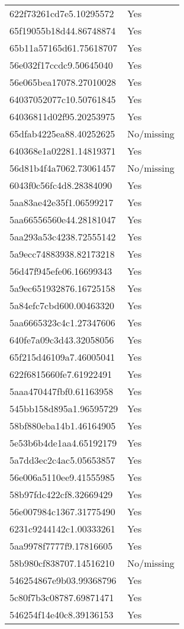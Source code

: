 \begin{tabular}{ll}
622f73261cd7e5.10295572 & Yes \\
65f19055b18d44.86748874 & Yes \\
65b11a57165d61.75618707 & Yes \\
56e032f17ccdc9.50645040 & Yes \\
56e065bea17078.27010028 & Yes \\
64037052077c10.50761845 & Yes \\
64036811d02f95.20253975 & Yes \\
65dfab4225ea88.40252625 & No/missing \\
640368e1a02281.14819371 & Yes \\
56d81b4f4a7062.73061457 & No/missing \\
6043f0c56fc4d8.28384090 & Yes \\
5aa83ae42e35f1.06599217 & Yes \\
5aa66556560e44.28181047 & Yes \\
5aa293a53c4238.72555142 & Yes \\
5a9ecc74883938.82173218 & Yes \\
56d47f945efe06.16699343 & Yes \\
5a9ec651932876.16725158 & Yes \\
5a84efc7cbd600.00463320 & Yes \\
5aa6665323c4c1.27347606 & Yes \\
640fe7a09c3d43.32058056 & Yes \\
65f215d46109a7.46005041 & Yes \\
622f6815660fe7.61922491 & Yes \\
5aaa470447fbf0.61163958 & Yes \\
545bb158d895a1.96595729 & Yes \\
58bf880eba14b1.46164905 & Yes \\
5e53b6b4de1aa4.65192179 & Yes \\
5a7dd3ec2c4ac5.05653857 & Yes \\
56e006a5110ee9.41555985 & Yes \\
58b97fdc422cf8.32669429 & Yes \\
56e007984c1367.31775490 & Yes \\
6231c9244142c1.00333261 & Yes \\
5aa9978f7777f9.17816605 & Yes \\
58b980cf838707.14516210 & No/missing \\
546254867e9b03.99368796 & Yes \\
5c80f7b3c08787.69871471 & Yes \\
546254f14e40c8.39136153 & Yes \\

\end{tabular}

